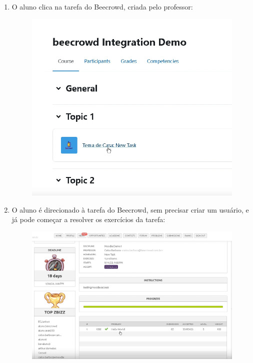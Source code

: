 \begin{enumerate}
    \item O aluno clica na tarefa do Beecrowd, criada pelo professor:

    \begin{figure}[H]
        \centering
            \includegraphics[scale=0.425]{pictures/apendices/apendice_b_18.png}
    \end{figure}

    \item O aluno é direcionado à tarefa do Beecrowd, sem precisar criar um usuário, e já pode começar a resolver os exercícios da tarefa:

    \begin{figure}[H]
        \centering
            \includegraphics[scale=0.35]{pictures/apendices/apendice_b_19.png}
    \end{figure}


\end{enumerate}
